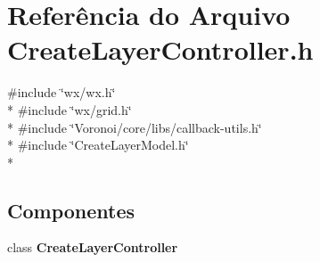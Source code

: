 \section{Referência do Arquivo Create\+Layer\+Controller.\+h}
\label{_create_layer_controller_8h}
{\ttfamily \#include \char`\"{}wx/wx.\+h\char`\"{}}\\*
{\ttfamily \#include \char`\"{}wx/grid.\+h\char`\"{}}\\*
{\ttfamily \#include \char`\"{}Voronoi/core/libs/callback-\/utils.\+h\char`\"{}}\\*
{\ttfamily \#include \char`\"{}Create\+Layer\+Model.\+h\char`\"{}}\\*
\subsection*{Componentes}
\begin{DoxyCompactItemize}
\item 
class {\bf Create\+Layer\+Controller}
\end{DoxyCompactItemize}
